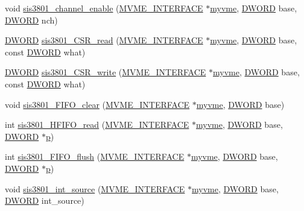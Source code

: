 \begin{DoxyCompactItemize}
void \hyperlink{sis3801_8h_ac24aabb3d25468e91ab1da6640229f8e}{sis3801\_\-channel\_\-enable} (\hyperlink{structMVME__INTERFACE}{MVME\_\-INTERFACE} $\ast$\hyperlink{fevmemodules_8c_aeab89db2ad759342a32dcd50a0a0156c}{myvme}, \hyperlink{vt2_8h_a798af1e30bc65f319c1a246cecf59e39}{DWORD} base, \hyperlink{vt2_8h_a798af1e30bc65f319c1a246cecf59e39}{DWORD} nch)
\item 
\hyperlink{vt2_8h_a798af1e30bc65f319c1a246cecf59e39}{DWORD} \hyperlink{sis3801_8h_aac90e641397717a461ea29e640bcd529}{sis3801\_\-CSR\_\-read} (\hyperlink{structMVME__INTERFACE}{MVME\_\-INTERFACE} $\ast$\hyperlink{fevmemodules_8c_aeab89db2ad759342a32dcd50a0a0156c}{myvme}, \hyperlink{vt2_8h_a798af1e30bc65f319c1a246cecf59e39}{DWORD} base, const \hyperlink{vt2_8h_a798af1e30bc65f319c1a246cecf59e39}{DWORD} what)
\item 
\hyperlink{vt2_8h_a798af1e30bc65f319c1a246cecf59e39}{DWORD} \hyperlink{sis3801_8h_a307bd17779d86d4a2b915a853b8e606a}{sis3801\_\-CSR\_\-write} (\hyperlink{structMVME__INTERFACE}{MVME\_\-INTERFACE} $\ast$\hyperlink{fevmemodules_8c_aeab89db2ad759342a32dcd50a0a0156c}{myvme}, \hyperlink{vt2_8h_a798af1e30bc65f319c1a246cecf59e39}{DWORD} base, const \hyperlink{vt2_8h_a798af1e30bc65f319c1a246cecf59e39}{DWORD} what)
\item 
void \hyperlink{sis3801_8h_aa4adc6e9d7174d4f14a0fe24eeff603f}{sis3801\_\-FIFO\_\-clear} (\hyperlink{structMVME__INTERFACE}{MVME\_\-INTERFACE} $\ast$\hyperlink{fevmemodules_8c_aeab89db2ad759342a32dcd50a0a0156c}{myvme}, \hyperlink{vt2_8h_a798af1e30bc65f319c1a246cecf59e39}{DWORD} base)
\item 
int \hyperlink{sis3801_8h_a01ae0f7294447474a14a4f9327ac42f1}{sis3801\_\-HFIFO\_\-read} (\hyperlink{structMVME__INTERFACE}{MVME\_\-INTERFACE} $\ast$\hyperlink{fevmemodules_8c_aeab89db2ad759342a32dcd50a0a0156c}{myvme}, \hyperlink{vt2_8h_a798af1e30bc65f319c1a246cecf59e39}{DWORD} base, \hyperlink{vt2_8h_a798af1e30bc65f319c1a246cecf59e39}{DWORD} $\ast$\hyperlink{sis3803_8c_afcb0609a0beab248bb3994a3368bd9ff}{p})
\item 
int \hyperlink{sis3801_8h_a582b23c0d4b194f737cf9bf62e44de9e}{sis3801\_\-FIFO\_\-flush} (\hyperlink{structMVME__INTERFACE}{MVME\_\-INTERFACE} $\ast$\hyperlink{fevmemodules_8c_aeab89db2ad759342a32dcd50a0a0156c}{myvme}, \hyperlink{vt2_8h_a798af1e30bc65f319c1a246cecf59e39}{DWORD} base, \hyperlink{vt2_8h_a798af1e30bc65f319c1a246cecf59e39}{DWORD} $\ast$\hyperlink{sis3803_8c_afcb0609a0beab248bb3994a3368bd9ff}{p})
\item 
void \hyperlink{sis3801_8h_afabe260ab7dfe46d4114d0938a978f42}{sis3801\_\-int\_\-source} (\hyperlink{structMVME__INTERFACE}{MVME\_\-INTERFACE} $\ast$\hyperlink{fevmemodules_8c_aeab89db2ad759342a32dcd50a0a0156c}{myvme}, \hyperlink{vt2_8h_a798af1e30bc65f319c1a246cecf59e39}{DWORD} base, \hyperlink{vt2_8h_a798af1e30bc65f319c1a246cecf59e39}{DWORD} int\_\-source)

\end{DoxyCompactItemize}
